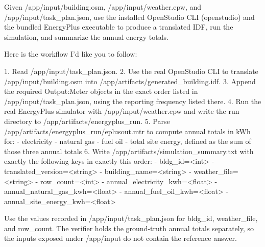 \begin{instructionbox}
Given \textasciigrave{}/app/input/building.osm\textasciigrave{}, \textasciigrave{}/app/input/weather.epw\textasciigrave{}, and \textasciigrave{}/app/input/task\_plan.json\textasciigrave{}, use the installed OpenStudio CLI (\textasciigrave{}openstudio\textasciigrave{}) and the bundled EnergyPlus executable to produce a translated IDF, run the simulation, and summarize the annual energy totals.

Here is the workflow I'd like you to follow:

1. Read \textasciigrave{}/app/input/task\_plan.json\textasciigrave{}.
2. Use the real OpenStudio CLI to translate \textasciigrave{}/app/input/building.osm\textasciigrave{} into \textasciigrave{}/app/artifacts/generated\_building.idf\textasciigrave{}.
3. Append the required \textasciigrave{}Output:Meter\textasciigrave{} objects in the exact order listed in \textasciigrave{}/app/input/task\_plan.json\textasciigrave{}, using the reporting frequency listed there.
4. Run the real EnergyPlus simulator with \textasciigrave{}/app/input/weather.epw\textasciigrave{} and write the run directory to \textasciigrave{}/app/artifacts/energyplus\_run\textasciigrave{}.
5. Parse \textasciigrave{}/app/artifacts/energyplus\_run/eplusout.mtr\textasciigrave{} to compute annual totals in kWh for:
   - electricity
   - natural gas
   - fuel oil
   - total site energy, defined as the sum of those three annual totals
6. Write \textasciigrave{}/app/artifacts/simulation\_summary.txt\textasciigrave{} with exactly the following keys in exactly this order:
   - \textasciigrave{}bldg\_id=\textless{}int\textgreater{}\textasciigrave{}
   - \textasciigrave{}translated\_version=\textless{}string\textgreater{}\textasciigrave{}
   - \textasciigrave{}building\_name=\textless{}string\textgreater{}\textasciigrave{}
   - \textasciigrave{}weather\_file=\textless{}string\textgreater{}\textasciigrave{}
   - \textasciigrave{}row\_count=\textless{}int\textgreater{}\textasciigrave{}
   - \textasciigrave{}annual\_electricity\_kwh=\textless{}float\textgreater{}\textasciigrave{}
   - \textasciigrave{}annual\_natural\_gas\_kwh=\textless{}float\textgreater{}\textasciigrave{}
   - \textasciigrave{}annual\_fuel\_oil\_kwh=\textless{}float\textgreater{}\textasciigrave{}
   - \textasciigrave{}annual\_site\_energy\_kwh=\textless{}float\textgreater{}\textasciigrave{}

Use the values recorded in \textasciigrave{}/app/input/task\_plan.json\textasciigrave{} for \textasciigrave{}bldg\_id\textasciigrave{}, \textasciigrave{}weather\_file\textasciigrave{}, and \textasciigrave{}row\_count\textasciigrave{}. The verifier holds the ground-truth annual totals separately, so the inputs exposed under \textasciigrave{}/app/input\textasciigrave{} do not contain the reference answer.


\end{instructionbox}

